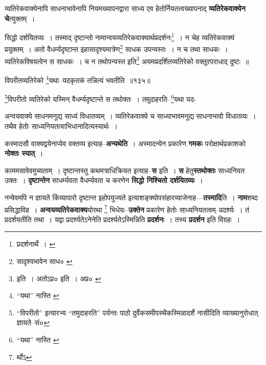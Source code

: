 \documentclass[article,12pt,a4paper]{memoir}
\begin{document}
	  \pstart व्यतिरेकवाक्येनापि साधनाभावेनापि नियमख्यापनद्वारा साध्य एव हेतोर्नियतत्वख्यापनाद् \textbf{व्यतिरेकवाक्येन चे}त्युक्तम् ।
	\pend
	  \bigskip
	  \begingroup
	

	  \pstart सिद्धो दर्शयितव्यः । तस्माद् दृष्टान्तो नामान्वयव्यतिरेकवाक्यार्थप्रदर्शनः\footnote{प्रदर्शनार्थे । \cite{dp-msC} \cite{dp-msD}} । न चेह व्यतिरेकवाक्यं प्रयुक्तम् । अतो वैधर्म्यदृष्टान्त इहासादृश्यमात्रेण\footnote{सादृश्यभावेन साध० \cite{dp-msA} \cite{dp-msB} \cite{dp-edP} \cite{dp-edH} \cite{dp-edN}} साधक उपन्यस्तः । न च तथा साधकः । व्यतिरेकविषयत्वेन स साधकः । च न तथोपन्यस्त इति\footnote{इति । अतोऽप्र० \cite{dp-msA} \cite{dp-edP} \cite{dp-edH} \cite{dp-edE} \cite{dp-edN} इति । अप्र० \cite{dp-msC}} अयमप्रदर्शितव्यतिरेको वक्तुरपराधाद् दुष्टः ॥
	\pend
       
	  \bigskip
	  \begingroup
	

	  \pstart विपरीतव्यतिरेको \footnote{“यथा” नास्ति \cite{dp-msD}}\-यथा--यदकृतकं तन्नित्यं भवतीति ॥१३५॥
	\pend
      
	  \endgroup
	 

	  \pstart \footnote{“विपरीतो” इत्यारभ्य “तमुदाहरति” पर्यन्तः पाठो दुर्वेकसमीपस्थैकस्मिन्नादर्शे नासीदिति व्याख्यानुरोधात् ज्ञायते--सं०}\-विपरीतो व्यतिरेको यस्मिन् वैधर्म्यदृष्टान्ते स तथोक्तः । तमुदाहरति--\footnote{“यथा” नास्ति \cite{dp-msA} \cite{dp-msB} \cite{dp-edP} \cite{dp-edH} \cite{dp-edE} \cite{dp-edN}}\-यथा यद-
	\pend
      
	  \endgroup
	

	  \pstart अन्वयवाक्ये साधनमनूद्य साध्यं विधातव्यम् । व्यतिरेकवाक्ये च साध्याभावमनूद्य साधनाभावो विधातव्यः । तथैव हेतोः साध्यनियतत्वाभिधानादित्यस्यार्थः ।
	\pend
      

	  \pstart कस्मादसौ वाक्यद्वयेनाप्येव वक्तव्य इत्याह--\textbf{अन्यथेति} । अस्मादन्येन प्रकारेण \textbf{गमकः} परोक्षार्थप्रकाशको \textbf{नोक्तः स्यात्} ।
	\pend
      

	  \pstart काममसावेवमुच्यताम् । दृष्टान्तस्तु कथमत्राधिक्रियत इत्याह--\textbf{स} इति । \textbf{स} हेतु\textbf{स्तथोक्तः} साध्यनियत उक्तः । \textbf{दृष्टान्तेन} साधर्म्यवता वैधर्म्यवता च करणेन \textbf{सिद्धो निश्चितो दर्शयितव्यः} ।
	\pend
      

	  \pstart नन्वेवमपि न ज्ञायते किंव्यापारो दृष्टान्त इहोपयुज्यते इत्याशङ्क्योपसंहारव्याजेनाह—\textbf{तस्मादि}ति । \textbf{नाम}शब्दः प्रसिद्धाविह । \textbf{अन्वयव्यतिरेकवाक्य}योरथा \footnote{र्थोऽ} भिधेयः--\textbf{उक्तेन} प्रकारेण हेतोः साध्यनियतत्वम्--प्रदर्श्यः । तं प्रदर्शयतीति तथा । यद्वा प्रदर्श्यतेऽनेनेति प्रदर्श्यतेऽस्मिन्निति \textbf{प्रदर्शनः} । तस्य \textbf{प्रदर्शन} इति विग्रहः ।
	\pend
      
\end{document}
